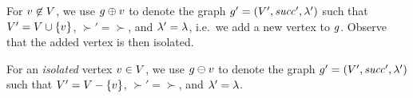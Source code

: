 %
\begin{graphop}[$\graph\addVertex{\vertex}$]
  For $v\not\in V$, we use $\graph\addVertex{\vertex}$ to
  denote the graph $g'=\left(V',{\it succ}',\lambda'\right)$ such
  that $V'=V\cup\left\{v\right\}$, $\succ'=\succ$, and
  $\lambda'=\lambda$, i.e.\ we add a new vertex to $g$.
  Observe that the added vertex is then isolated.
\end{graphop}
%


%
\begin{graphop}[$\graph\delVertex{\vertex}$]
  For an {\it isolated} vertex $v\in V$, we use
  $\graph\delVertex{\vertex}$ to denote the graph
  $g'=\left(V',{\it succ}',\lambda'\right)$ such that
  $V'=V-\left\{v\right\}$, $\succ'=\succ$, and
  $\lambda'=\lambda$.
\end{graphop}
%


